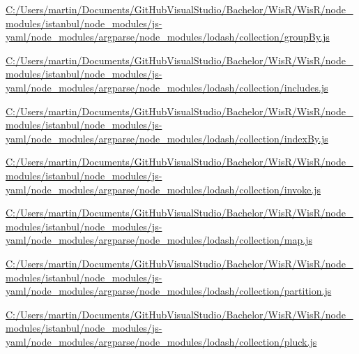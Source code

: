 \begin{DoxyCompactItemize}
\item 
\hyperlink{_c_1_2_users_2martin_2_documents_2_git_hub_visual_studio_2_bachelor_2_wis_r_2_wis_r_2node_module155eac53aebd772a5511d6f6811ca304}{C\+:/\+Users/martin/\+Documents/\+Git\+Hub\+Visual\+Studio/\+Bachelor/\+Wis\+R/\+Wis\+R/node\+\_\+modules/istanbul/node\+\_\+modules/js-\/yaml/node\+\_\+modules/argparse/node\+\_\+modules/lodash/collection/group\+By.\+js}
\item 
\hyperlink{_c_1_2_users_2martin_2_documents_2_git_hub_visual_studio_2_bachelor_2_wis_r_2_wis_r_2node_module7b2065432211f72c2f31445444d4568a}{C\+:/\+Users/martin/\+Documents/\+Git\+Hub\+Visual\+Studio/\+Bachelor/\+Wis\+R/\+Wis\+R/node\+\_\+modules/istanbul/node\+\_\+modules/js-\/yaml/node\+\_\+modules/argparse/node\+\_\+modules/lodash/collection/includes.\+js}
\item 
\hyperlink{_c_1_2_users_2martin_2_documents_2_git_hub_visual_studio_2_bachelor_2_wis_r_2_wis_r_2node_moduleb5a68885a67a6e4a2186a62e4c965baf}{C\+:/\+Users/martin/\+Documents/\+Git\+Hub\+Visual\+Studio/\+Bachelor/\+Wis\+R/\+Wis\+R/node\+\_\+modules/istanbul/node\+\_\+modules/js-\/yaml/node\+\_\+modules/argparse/node\+\_\+modules/lodash/collection/index\+By.\+js}
\item 
\hyperlink{_c_1_2_users_2martin_2_documents_2_git_hub_visual_studio_2_bachelor_2_wis_r_2_wis_r_2node_module8c8cc7aba5f0c1ede5868dedc57812b1}{C\+:/\+Users/martin/\+Documents/\+Git\+Hub\+Visual\+Studio/\+Bachelor/\+Wis\+R/\+Wis\+R/node\+\_\+modules/istanbul/node\+\_\+modules/js-\/yaml/node\+\_\+modules/argparse/node\+\_\+modules/lodash/collection/invoke.\+js}
\item 
\hyperlink{_c_1_2_users_2martin_2_documents_2_git_hub_visual_studio_2_bachelor_2_wis_r_2_wis_r_2node_module4ced2e2ffc7f13e036cc740269cc9113}{C\+:/\+Users/martin/\+Documents/\+Git\+Hub\+Visual\+Studio/\+Bachelor/\+Wis\+R/\+Wis\+R/node\+\_\+modules/istanbul/node\+\_\+modules/js-\/yaml/node\+\_\+modules/argparse/node\+\_\+modules/lodash/collection/map.\+js}
\item 
\hyperlink{_c_1_2_users_2martin_2_documents_2_git_hub_visual_studio_2_bachelor_2_wis_r_2_wis_r_2node_module1a3cfabad9707155e4efdc7c8dac9c48}{C\+:/\+Users/martin/\+Documents/\+Git\+Hub\+Visual\+Studio/\+Bachelor/\+Wis\+R/\+Wis\+R/node\+\_\+modules/istanbul/node\+\_\+modules/js-\/yaml/node\+\_\+modules/argparse/node\+\_\+modules/lodash/collection/partition.\+js}
\item 
\hyperlink{_c_1_2_users_2martin_2_documents_2_git_hub_visual_studio_2_bachelor_2_wis_r_2_wis_r_2node_module98a6357a3d51f316514f9300112d9446}{C\+:/\+Users/martin/\+Documents/\+Git\+Hub\+Visual\+Studio/\+Bachelor/\+Wis\+R/\+Wis\+R/node\+\_\+modules/istanbul/node\+\_\+modules/js-\/yaml/node\+\_\+modules/argparse/node\+\_\+modules/lodash/collection/pluck.\+js}

\end{DoxyCompactItemize}

